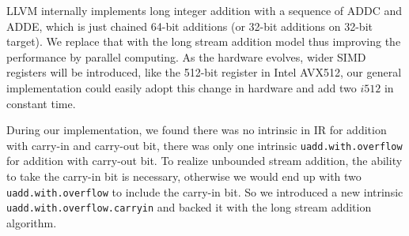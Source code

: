 LLVM internally implements long integer addition with a sequence of ADDC and ADDE, which is just chained 64-bit additions (or 32-bit additions on 32-bit target). We replace that with the long stream addition model thus improving the performance by parallel computing. As the hardware evolves, wider SIMD registers will be introduced, like the 512-bit register in Intel AVX512, our general implementation could easily adopt this change in hardware and add two $i512$ in constant time.

During our implementation, we found there was no intrinsic in IR for addition with carry-in and carry-out bit, there was only one intrinsic {\tt uadd.with.overflow} for addition with carry-out bit. To realize unbounded stream addition, the ability to take the carry-in bit is necessary, otherwise we would end up with two {\tt uadd.with.overflow} to include the carry-in bit. So we introduced a new intrinsic {\tt uadd.with.overflow.carryin} and backed it with the long stream addition algorithm.
